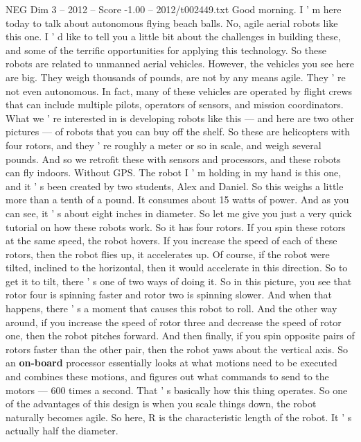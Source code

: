 \begin{textsample}{NEG Dim 3 – 2012 – Score -1.00 – 2012/t002449.txt}  \label{ex:f3_neg_039}
Good morning.
I ' m here today to talk about autonomous flying beach balls.
No, agile aerial robots like this one.
I ' d like to tell you a little bit about the challenges in building these, and some of the terrific opportunities for applying this technology.
So these robots are related to unmanned aerial vehicles.
However, the vehicles you see here are big.
They weigh thousands of pounds, are not by any means agile.
They ' re not even autonomous.
In fact, many of these vehicles are operated by flight crews that can include multiple pilots, operators of sensors, and mission coordinators.
What we ' re interested in is developing robots like this — and here are two other pictures — of robots that you can buy off the shelf.
So these are helicopters with four rotors, and they ' re roughly a meter or so in scale, and weigh several pounds.
And so we retrofit these with sensors and processors, and these robots can fly indoors.
Without GPS.
The robot I ' m holding in my hand is this one, and it ' s been created by two students, Alex and Daniel.
So this weighs a little more than a tenth of a pound.
It consumes about 15 watts of power.
And as you can see, it ' s about eight inches in diameter.
So let me give you just a very quick tutorial on how these robots work.
So it has four rotors.
If you spin these rotors at the same speed, the robot hovers.
If you increase the speed of each of these rotors, then the robot flies up, it accelerates up.
Of course, if the robot were tilted, inclined to the horizontal, then it would accelerate in this direction.
So to get it to tilt, there ' s one of two ways of doing it.
So in this picture, you see that rotor four is spinning faster and rotor two is spinning slower.
And when that happens, there ' s a moment that causes this robot to roll.
And the other way around, if you increase the speed of rotor three and decrease the speed of rotor one, then the robot pitches forward.
And then finally, if you spin opposite pairs of rotors faster than the other pair, then the robot yaws about the vertical axis.
So an \textbf{on-board} processor essentially looks at what motions need to be executed and combines these motions, and figures out what commands to send to the motors — 600 times a second.
That ' s basically how this thing operates.
So one of the advantages of this design is when you scale things down, the robot naturally becomes agile.
So here, R is the characteristic length of the robot.
It ' s actually half the diameter.

\end{textsample}
